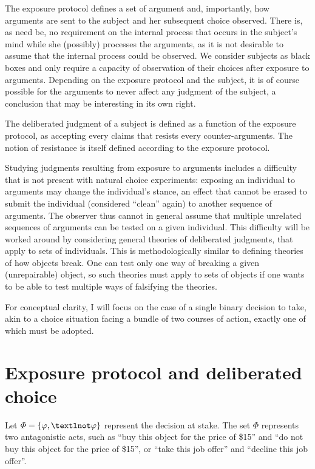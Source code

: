 \documentclass[version=last, pagesize, twoside=off, bibliography=totoc, DIV=calc, fontsize=12pt, a4paper, french, english]{scrartcl}
\begin{document}
The exposure protocol defines a set of argument and, importantly, how arguments are sent to the subject and her subsequent choice observed. There is, as need be, no requirement on the internal process that occurs in the subject’s mind while she (possibly) processes the arguments, as it is not desirable to assume that the internal process could be observed. We consider subjects as black boxes and only require a capacity of observation of their choices after exposure to arguments. Depending on the exposure protocol and the subject, it is of course possible for the arguments to never affect any judgment of the subject, a conclusion that may be interesting in its own right.

The deliberated judgment of a subject is defined as a function of the exposure protocol, as accepting every claims that resists every counter-arguments. The notion of resistance is itself defined according to the exposure protocol.

Studying judgments resulting from exposure to arguments includes a difficulty that is not present with natural choice experiments: exposing an individual to arguments may change the individual’s stance, an effect that cannot be erased to submit the individual (considered “clean” again) to another sequence of arguments. The observer thus cannot in general assume that multiple unrelated sequences of arguments can be tested on a given individual. This difficulty will be worked around by considering general theories of deliberated judgments, that apply to sets of individuals. This is methodologically similar to defining theories of how objects break. One can test only one way of breaking a given (unrepairable) object, so such theories must apply to sets of objects if one wants to be able to test multiple ways of falsifying the theories.

For conceptual clarity, I will focus on the case of a single binary decision to take, akin to a choice situation facing a bundle of two courses of action, exactly one of which must be adopted.

\section{Exposure protocol and deliberated choice}
Let $\Phi = \set{\phi, ¬\phi}$ represent the decision at stake. The set $\Phi$ represents two antagonistic acts, such as “buy this object for the price of \$15” and “do not buy this object for the price of \$15”, or “take this job offer” and “decline this job offer”.
\end{document}
